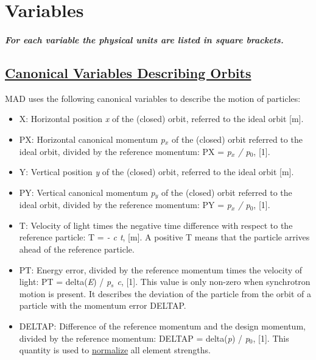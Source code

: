 
\section{Variables}

\subparagraph{ For each variable the physical units are listed in square brackets. }

\subsection{\href{canon}{Canonical Variables Describing Orbits}} 
MAD uses the following canonical variables to describe the motion of particles: 
\begin{itemize}
   \item X: Horizontal position \textit{x} of the (closed) orbit,
     referred to the ideal orbit [m].    
   \item PX: Horizontal canonical momentum \textit{p$_x$} of the
     (closed) orbit referred to the ideal orbit, divided by the
     reference momentum: PX = \textit{p$_x$ / p$_0$}, [1].   
   \item Y: Vertical position \textit{y} of the (closed) orbit, referred
     to the ideal orbit [m].   
   \item PY: Vertical canonical momentum \textit{p$_y$} of the (closed)
     orbit referred to the ideal orbit, divided by the reference
     momentum: PY = \textit{p$_x$ / p$_0$}, [1].   
   \item T: Velocity of light times the negative time difference with
     respect to the reference particle: T = \textit{ - c t}, [m]. A
     positive T means that the particle arrives ahead of the reference
     particle.   
   \item PT: Energy error, divided by the reference momentum times the
     velocity of light: PT = delta(\textit{E}) / \textit{p$_s$ c},
     [1]. This value is only non-zero when synchrotron motion is
     present. It describes the deviation of the particle from the orbit
     of a particle with the momentum error DELTAP.   
   \item DELTAP: Difference of the reference momentum and the design
     momentum, divided by the reference momentum: DELTAP =
     delta(\textit{p}) / \textit{p$_0$}, [1]. This quantity is used to
     \href{defects.html}{normalize} all element strengths.   
\end{itemize} 

